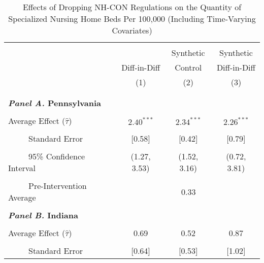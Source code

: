 \documentclass[12pt]{article}
\begin{document}
\vfill
\begin{table}[htbp]\centering \footnotesize
\def\sym#1{\ifmmode^{#1}\else\(^{#1}\)\fi}
\captionsetup{width=.75\textwidth}
\caption{\centering Effects of Dropping NH-CON Regulations on the Quantity of Specialized Nursing Home Beds Per 100,000 (Including Time-Varying Covariates)}
\label{tab:ave_results_q_specbeds_nobord_cov}
\setlength{\tabcolsep}{10pt}
\begin{tabular}{l*{3}{c}}
\hline\hline
\\[-2ex]
&\multicolumn{1}{c}{}&\multicolumn{1}{c}{Synthetic}&\multicolumn{1}{c}{Synthetic}\\
&\multicolumn{1}{c}{Diff-in-Diff}&\multicolumn{1}{c}{Control}&\multicolumn{1}{c}{Diff-in-Diff}\\
&\multicolumn{1}{c}{(1)}&\multicolumn{1}{c}{(2)}&\multicolumn{1}{c}{(3)}\\
\\[-2ex]
\hline
\\[-.1ex]
\multicolumn{4}{l}{\textbf{\textit{Panel A.} Pennsylvania}}\\
\\[-1.5ex]
\multicolumn{1}{l}{Average Effect ($\hat{\tau}$)}&   \multicolumn{1}{c}{$2.40^{***}$}&   \multicolumn{1}{c}{$2.34^{***}$}&  \multicolumn{1}{c}{$2.26^{***}$}\\
\\[-2ex]
\multicolumn{1}{l}{\ \ \ \ \ Standard Error}  &\multicolumn{1}{c}{[0.58]}&\multicolumn{1}{c}{[0.42]}&\multicolumn{1}{c}{[0.79]}\\
\\[-2ex]
\multicolumn{1}{l}{\ \ \ \ \ 95\% Confidence Interval}&   \multicolumn{1}{c}{(1.27, 3.53)}&   \multicolumn{1}{c}{(1.52, 3.16)}&   \multicolumn{1}{c}{(0.72, 3.81)}\\
\\[-2ex]
\multicolumn{1}{l}{\ \ \ \ \ Pre-Intervention Average}&   \multicolumn{3}{c}{0.33}\\
\\[-.1ex]
\multicolumn{4}{l}{\textbf{\textit{Panel B.} Indiana}}\\
\\[-1.5ex]
\multicolumn{1}{l}{Average Effect ($\hat{\tau}$)}&   \multicolumn{1}{c}{0.69}&   \multicolumn{1}{c}{0.52} &  \multicolumn{1}{c}{0.87}\\
\\[-2ex]
\multicolumn{1}{l}{\ \ \ \ \ Standard Error}  &\multicolumn{1}{c}{[0.64]}&\multicolumn{1}{c}{[0.53]}&\multicolumn{1}{c}{[1.02]}\\

\end{tabular}
\end{table}
\end{document}
